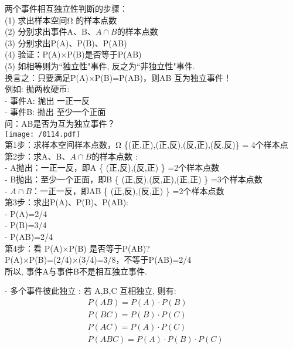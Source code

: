 \documentclass[UTF8]{ctexart}
\begin{document}
	
	\begin{myEnvSample}
		两个事件相互独立性判断的步骤： \\
		(1) 求出样本空间Ω 的样本点数 \\
		(2) 分别求出事件A、B、$A \cap B$的样本点数 \\
		(3) 分别求出P(A)、P(B)、P(AB) \\
		(4) 验证：P(A)×P(B)是否等于P(AB) \\
		(5) 如相等则为``独立性"事件, 反之为``非独立性"事件. \\
		
		换言之：只要满足P(A)×P(B)=P(AB)，则AB 互为独立事件！ \\
		
		例如: 抛两枚硬币: \\
		- 事件A: 抛出 一正一反 \\
		- 事件B: 抛出 至少一个正面 \\
		问：AB是否为互为独立事件？ \\
		
		\texttt{[image: /0114.pdf]} \\
		
		第1步：求样本空间样本点数，Ω \{(正,正),(正,反),(反,正),(反,反)\} = 4个样本点 \\
		
		第2步：求A、B、$A \cap B$的样本点数 : \\
		- A抛出：一正一反，即A \{ (正,反),(反,正) \} =2个样本点数 \\
		- B抛出：至少一个正面，即B \{ (正,反),(反,正),(正,正) \} =3个样本点数 \\
		- $A \cap B$：一正一反，即AB \{ (正,反),(反,正) \} =2个样本点数 \\
		
		第3步：求出P(A)、P(B)、P(AB): \\
		- P(A)=2/4 \\
		- P(B)=3/4 \\
		- P(AB)=2/4 \\
		
		
		第4步：看 P(A)×P(B) 是否等于P(AB)? \\
		P(A)×P(B)=(2/4)×(3/4)=3/8，不等于P(AB)=2/4 \\
		所以, 事件A与事件B不是相互独立事件.
		
	\end{myEnvSample}
	
	
	
	- 多个事件彼此独立 : 若 A,B,C 互相独立, 则有: 
	\begin{align*}  %
		& P(AB)=P(A)\cdot P(B)\\
		& P(BC)=P(B)\cdot P(C)\\
		& P(AC)=P(A)\cdot P(C)\\
		& P(ABC)=P(A)\cdot P(B)\cdot P(C) 
	\end{align*}
	
\end{document}

